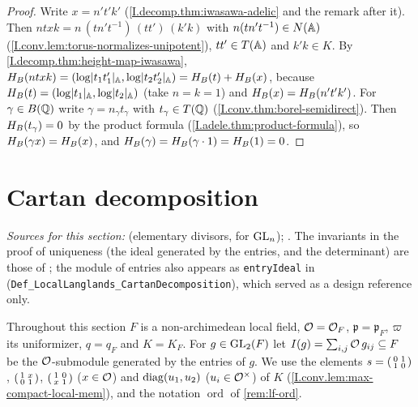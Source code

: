 \begin{theorem}
\end{theorem}
\begin{proof}
Write $x=n't'k'$ (\cref{I.decomp.thm:iwasawa-adelic} and the remark after it). Then
$ntxk=n\,(tn't^{-1})\,(tt')\,(k'k)$ with $n(tn't^{-1})\in N(\mathbb{A})$ (\cref{I.conv.lem:torus-normalizes-unipotent}),
$tt'\in T(\mathbb{A})$ and $k'k\in K$. By \cref{I.decomp.thm:height-map-iwasawa},
$H_B(ntxk)=(\log\lvert t_1t'_1\rvert_{\mathbb{A}},\log\lvert t_2t'_2\rvert_{\mathbb{A}})=H_B(t)+H_B(x)$, because $H_B(t)=(\log\lvert t_1\rvert_{\mathbb{A}},\log\lvert t_2\rvert_{\mathbb{A}})$
(take $n=k=1$) and $H_B(x)=H_B(n't'k')$. For $\gamma\in B(\mathbb{Q})$ write $\gamma=n_\gamma t_\gamma$ with
$t_\gamma\in T(\mathbb{Q})$ (\cref{I.conv.thm:borel-semidirect}). Then $H_B(t_\gamma)=0$ by the product formula
(\cref{I.adele.thm:product-formula}), so $H_B(\gamma x)=H_B(x)$, and $H_B(\gamma)=H_B(\gamma\cdot1)=H_B(1)=0$.
\end{proof}

\section{Cartan decomposition}\label{sec:cartan}

\noindent\emph{Sources for this section:} \cite[§9, Prop.~35, pp.~49--50]{BumpH} (elementary divisors, for
$\mathrm{GL}_n$); \cite[§9.1]{Cas-p}. The invariants in the proof of uniqueness (the ideal generated by the entries, and the
determinant) are those of \cite[Prop.~35]{BumpH}; the module of entries also appears as \texttt{entryIdeal} in
\cite{AFLT} (\texttt{Def\_LocalLanglands\_\allowbreak CartanDecomposition}), which served as a design reference only.

Throughout this section $F$ is a non-archimedean local field, $\mathcal{O}=\mathcal{O}_F$, $\mathfrak p=\mathfrak p_F$,
$\varpi$ its uniformizer, $q=q_F$ and $K=K_F$. For $g\in\mathrm{GL}_2(F)$ let $I(g)=\sum_{i,j}\mathcal{O}\,g_{ij}\subseteq F$ be the
$\mathcal{O}$-submodule generated by the entries of $g$. We use the elements
$s=\begin{psmallmatrix}0&1\\1&0\end{psmallmatrix}$, $\begin{psmallmatrix}1&x\\0&1\end{psmallmatrix}$,
$\begin{psmallmatrix}1&0\\x&1\end{psmallmatrix}$ ($x\in\mathcal{O}$) and $\operatorname{diag}(u_1,u_2)$ ($u_i\in\mathcal{O}^\times$) of $K$
(\cref{I.conv.lem:max-compact-local-mem}), and the notation $\operatorname{ord}$ of \cref{rem:lf-ord}.

